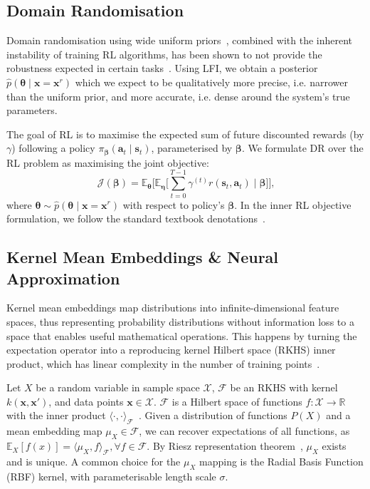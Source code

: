 \subsection{Domain Randomisation}
\label{subsec:dr-prelim}

Domain randomisation using wide uniform priors~\cite{tobin2017domain}, combined with the inherent instability of training RL algorithms, has been shown to not provide the robustness expected in certain tasks~\cite{peng2018sim, possas2020online}. 
Using LFI, we obtain a posterior $\hat{p}(\boldsymbol{\theta} \mid \mathbf{x} = \mathbf{x}^r)$ which we expect to be qualitatively more precise, i.e. narrower than the uniform prior, and more accurate, i.e. dense around the system's true parameters.

The goal of RL is to maximise the expected sum of future discounted rewards (by $\gamma$) following a policy $\pi_{\boldsymbol{\beta}}(\mathbf{a}_t \mid \mathbf{s}_t)$, parameterised by $\boldsymbol{\beta}$.
We formulate DR over the RL problem as maximising the joint objective:
\begin{equation}
    \mathcal{J}(\boldsymbol{\beta}) = \mathbb{E}_{\boldsymbol{\theta}} \Biggl[ \mathbb{E}_{\boldsymbol{\eta}} \Biggl[ \sum_{t=0}^{T-1} \gamma^{(t)} r(\mathbf{s}_t, \mathbf{a}_t) \mid \boldsymbol{\beta} \Biggr] \Biggr] \text{,}
\end{equation}
where $\boldsymbol{\theta} \sim \hat{p}(\boldsymbol{\theta} \mid \mathbf{x} = \mathbf{x}^r)$ with respect to policy's $\boldsymbol{\beta}$.
In the inner RL objective formulation, we follow the standard textbook denotations~\cite{sutton2018reinforcement}. 

\subsection{Kernel Mean Embeddings \& Neural Approximation}
\label{subsec:rkhs-bg}

Kernel mean embeddings map distributions into infinite-dimensional feature spaces, thus representing probability distributions without information loss to a space that enables useful mathematical operations.
This happens by turning the expectation operator into a reproducing kernel Hilbert space (RKHS) inner product, which has linear complexity in the number of training points~\cite{muandet2017kernel}.

Let $X$ be a random variable in sample space $\mathcal{X}$, $\mathcal{F}$ be an RKHS with kernel $k(\mathbf{x}, \mathbf{x}')$, and data points $\mathbf{x} \in \mathcal{X}$. $\mathcal{F}$ is a Hilbert space of functions $f : \mathcal{X} \rightarrow \mathbb{R}$ with the inner product $\langle \cdot , \cdot \rangle_{\mathcal{F}}$~\cite{ghojogh2021reproducing}.
Given a distribution of functions $P(X)$ and a mean embedding map $\mu_X \in \mathcal{F}$, we can recover expectations of all functions, as $\mathbb{E}_X [f(x)] = \langle \mu_X, f \rangle_{\mathcal{F}}, \forall f \in \mathcal{F}$. 
By Riesz representation theorem~\cite{akhiezer2013theory}, $\mu_X$ exists and is unique.
A common choice for the $\mu_X$ mapping is the Radial Basis Function (RBF) kernel, with parameterisable length scale $\sigma$.

